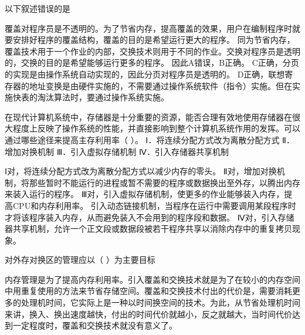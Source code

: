 \question 以下叙述错误的是
\par{}
\begin{solution}覆盖对程序员是不透明的。为了节省内存，提高覆盖的效果，用户在编制程序时就要安排好程序的覆盖结构，覆盖的目的是希望运行更大的程序。
同为节省内存，覆盖技术用于一个作业的内部，交换技术则用于不同的作业。交换对程序员是透明的，交换的目的是希望能够运行更多的程序。
因此A错误，B正确。
C正确，分页的实现是由操作系统自动实现的，因此分页对程序员是透明的。
D正确，联想寄存器的地址变换是由硬件实施的，不需要通过操作系统软件（指令）实施。但在实施快表的淘汰算法时，要通过操作系统实施。
\end{solution}
\question 在现代计算机系统中，存储器是十分重要的资源，能否合理有效地使用存储器在很大程度上反映了操作系统的性能，并直接影响到整个计算机系统作用的发挥。可以通过哪些途径来提高主存利用率（
）。 Ⅰ．将连续分配方式改为离散分配方式 Ⅱ．增加对换机制
Ⅲ．引入虚拟存储机制 Ⅳ．引入存储器共享机制
\par{}
\begin{solution}Ⅰ对，将连续分配方式改为离散分配方式以减少内存的零头。
Ⅱ对，增加对换机制，将那些暂时不能运行的进程或暂不需要的程序或数据换出至外存，以腾出内存来装入运行的程序。
Ⅲ对，引入虚拟存储机制，使更多的作业能够装入内存，提高CPU和内存利用率。
引入动态链接机制，当程序在运行中需要调用某段程序时才将该程序装入内存，从而避免装入不会用到的程序段和数据。
Ⅳ对，引入存储器共享机制，允许一个正文段或数据段被若干程序共享以消除内存中的重复拷贝现象。
\end{solution}
\question 对外存对换区的管理应以（ ）为主要目标
\par{}
\begin{solution}内存管理是为了提高内存利用率。引入覆盖和交换技术就是为了在较小的内存空间中用重复使用的方法来节省存储空间。覆盖和交换技术付出的代价是，需要消耗更多的处理机时间，它实际上是一种以时间换空间的技术。为此，从节省处理机时间来讲，换入、换出速度越快，付出的时间代价就越小，反之就越大，当时间代价达到一定程度时，覆盖和交换技术就没有意义了。
\end{solution}
